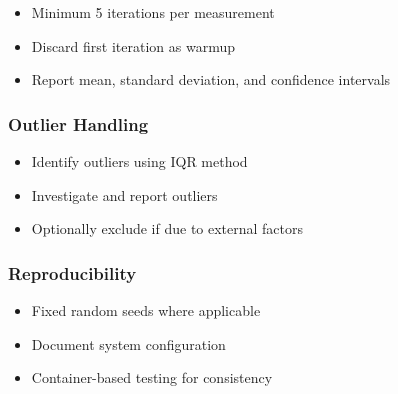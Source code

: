 \begin{itemize}
    \item Minimum 5 iterations per measurement
       \item Discard first iteration as warmup
    \item Report mean, standard deviation, and confidence intervals
\end{itemize}

\subsubsection{Outlier Handling}

\begin{itemize}
    \item Identify outliers using IQR method
    \item Investigate and report outliers
    \item Optionally exclude if due to external factors
\end{itemize}

\subsubsection{Reproducibility}

\begin{itemize}
    \item Fixed random seeds where applicable
    \item Document system configuration
    \item Container-based testing for consistency
\end{itemize}
